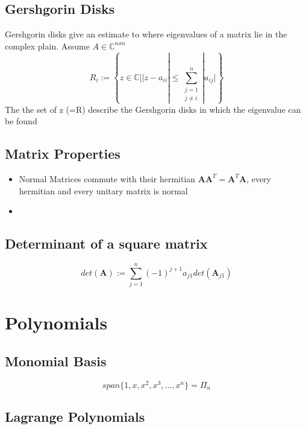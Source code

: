 \documentclass[
    a4paper,
    11pt
]{article}
\begin{document}
\subsection{Gershgorin Disks}

Gershgorin disks give an estimate to where eigenvalues of a matrix lie in the
complex plain. Assume $A \in \mathbb{C}^{n x n}$
\begin{equation}
    R_i := \left\{z \in{} \mathbb{C} |
    |z - a_{ii}| \leq{} \sum_{\substack{j=1 \\ j\neq{} i}}^{n}|a_{ij}| \right\}
\end{equation}
The the set of z (=R) describe the Gershgorin disks in which the eigenvalue can
be found

\subsection{Matrix Properties}

\begin{itemize}
    \item Normal Matrices commute with their hermitian $\mathbf{AA}^T =
        \mathbf{A}^T \mathbf{A}$, every hermitian and every unitary matrix is
        normal
    \item 
\end{itemize}

\subsection{Determinant of a square matrix}

\begin{equation}
    det(\mathbf{A}) := \sum_{j=1}^{n} (-1)^{j+1} a_{j1} det(\mathbf{A}_{j1})
\end{equation}


\section{Polynomials}

\subsection{Monomial Basis}

\begin{equation}
    span\{1, x, x^2, x^3, ..., x^n\} = \Pi_n
\end{equation}

\subsection{Lagrange Polynomials}
\end{document}
